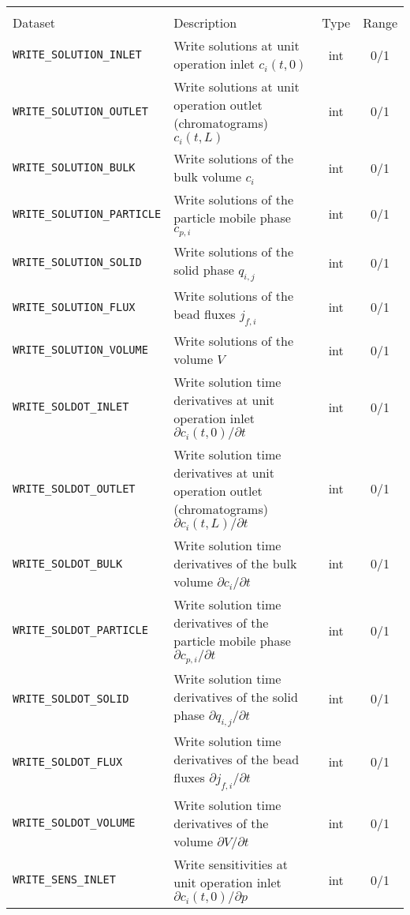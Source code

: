 \begin{table}[!ht]
\footnotesize
\begin{tabu}to \linewidth[m]{lX[m]cc} \toprule
{} \\
\rowfont[c]\normalfont Dataset & Description & Type & Range \everyrow{\midrule}\\
\texttt{WRITE\_SOLUTION\_INLET} & Write solutions at unit operation inlet $c_i(t,0)$ & int & 0/1 \\
\texttt{WRITE\_SOLUTION\_OUTLET} & Write solutions at unit operation outlet (chromatograms) $c_i(t,L)$ & int & 0/1 \\
\texttt{WRITE\_SOLUTION\_BULK} & Write solutions of the bulk volume $c_i$ & int & 0/1 \\
\texttt{WRITE\_SOLUTION\_PARTICLE} & Write solutions of the particle mobile phase $c_{p,i}$ & int & 0/1 \\
\texttt{WRITE\_SOLUTION\_SOLID} & Write solutions of the solid phase $q_{i,j}$ & int & 0/1 \\
\texttt{WRITE\_SOLUTION\_FLUX} & Write solutions of the bead fluxes $j_{f,i}$ & int & 0/1 \\
\texttt{WRITE\_SOLUTION\_VOLUME} & Write solutions of the volume $V$ & int & 0/1 \\
\texttt{WRITE\_SOLDOT\_INLET} & Write solution time derivatives at unit operation inlet $\partial c_i(t,0) / \partial t$ & int & 0/1 \\
\texttt{WRITE\_SOLDOT\_OUTLET} & Write solution time derivatives at unit operation outlet (chromatograms) $\partial c_i(t,L) / \partial t$ & int & 0/1 \\
\texttt{WRITE\_SOLDOT\_BULK} & Write solution time derivatives of the bulk volume $\partial c_i / \partial t$ & int & 0/1 \\
\texttt{WRITE\_SOLDOT\_PARTICLE} & Write solution time derivatives of the particle mobile phase $\partial c_{p,i} / \partial t$ & int & 0/1 \\
\texttt{WRITE\_SOLDOT\_SOLID} & Write solution time derivatives of the solid phase $\partial q_{i,j} / \partial t$ & int & 0/1 \\
\texttt{WRITE\_SOLDOT\_FLUX} & Write solution time derivatives of the bead fluxes $\partial j_{f,i} / \partial t$ & int & 0/1 \\
\texttt{WRITE\_SOLDOT\_VOLUME} & Write solution time derivatives of the volume $\partial V / \partial t$ & int & 0/1 \\
\texttt{WRITE\_SENS\_INLET} & Write sensitivities at unit operation inlet $\partial c_i(t,0) / \partial p$ & int & 0/1 \\

\end{tabu}
\end{table}
